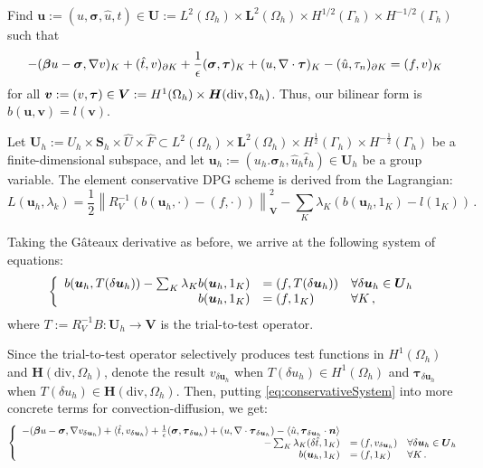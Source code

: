 \documentclass[letterpaper]{article}
\def\btau{\boldsymbol\tau}
\def\bsigma{\boldsymbol\sigma}
\def\bbeta{\boldsymbol\beta}
\newcommand{\bs}[1]{\boldsymbol{#1}}
\newcommand{\norm}[1]{\left\| #1 \right\|}
\newcommand{\bfH}{\mbox{\boldmath $H$}}
\newcommand{\vdeltau}{v_{\delta\bs u_h}}
\newcommand{\taudeltau}{\btau_{\delta\bs u_h}}
\begin{document}
Find
$\bs u:=(u,\bsigma,\hat u,\hat t)
\in\bs U:=L^2(\Omega_h)\times \bs L^2(\Omega_h)\times H^{1/2}(\Gamma_h)\times H^{-1/2}(\Gamma_h)$ 
such that
\begin{equation}
\label{eq:variationalFormulation}
-(\bbeta u-\bsigma,\nabla v)_K+(\hat t,v)_{\partial K}
+ \frac{1}{\epsilon}(\bsigma,\btau)_K
+(u,\nabla\cdot\btau)_K
-(\hat u,\tau_n)_{\partial K}=(f,v)_K \\
\end{equation}
for all $\bs v:=(v,\btau)\in
\bs V:=H^1(\Omega_h)\times\bfH(\text{div},\Omega_h)$. Thus, our bilinear form
is $b(\bs u,\bs v)=l(\bs v)$.

Let $\bs U_h:=U_h\times\bs S_h\times\hat U\times\hat F\subset L^2(\Omega_h)\times\bs
L^2(\Omega_h)\times H^{\frac{1}{2}}(\Gamma_h)\times H^{-\frac{1}{2}}(\Gamma_h)$
be a finite-dimensional subspace, and let $\bs u_h:=(u_h.\bsigma_h,\hat
u_h\hat t_h)\in\bs U_h$ be a group variable. The element conservative DPG scheme is
derived from the Lagrangian:
\begin{equation}
L(\bs u_h,\lambda_k)=\frac{1}{2}\norm{R_V^{-1}(b(\bs
u_h,\cdot)-(f,\cdot))}^2_{\bs V}-\sum_K\lambda_K(b(\bs u_h,1_K)-l(1_K))\,.
\label{eq:lagrangian}
\end{equation}

Taking the G\^ateaux derivative as before, we arrive at the following system
of equations:
\begin{equation}
\left\{
\begin{array}[c]{rll}
b(\bs u_h,T(\delta\bs u_h))-\sum_K\lambda_K b(\bs u_h,1_K)
&=(f,T(\delta\bs u_h)) & \forall\delta\bs u_h\in\bs U_h\\
b(\bs u_h,1_K) &=(f,1_K) & \forall K\,,
\end{array}
\right.
\label{eq:conservativeSystem}
\end{equation}
where $T:=R_V^{-1}B:\bs U_h\rightarrow\bs V$ is the trial-to-test operator.

Since the trial-to-test operator selectively produces test functions in
$H^1(\Omega_h)$ and $\bs H(\text{div},\Omega_h)$, denote the result
$v_{\delta\bs u_h}$ when $T(\delta u_h)\in H^1(\Omega_h)$ and
$\btau_{\delta\bs u_h}$ when $T(\delta u_h)\in \bs H(\text{div},\Omega_h)$.
Then, putting \ref{eq:conservativeSystem} into more concrete terms for
convection-diffusion, we get:
\begin{equation}
\left\{
\begin{array}[c]{rll}
-(\bbeta u-\bsigma,\nabla \vdeltau)+\langle\hat t,\vdeltau\rangle
+ \frac{1}{\epsilon}(\bsigma,\taudeltau)
+(u,\nabla\cdot\taudeltau)
-\langle\hat u,\taudeltau\cdot\bs n\rangle\\
-\sum_K\lambda_K (\delta\hat t,1_K)
&=(f,\vdeltau) & \forall\delta\bs u_h\in\bs U_h\\
b(\bs u_h,1_K) &=(f,1_K) & \forall K\,.
\end{array}
\right.
\label{eq:conservativeConfusionSystem}
\end{equation}
\end{document}
